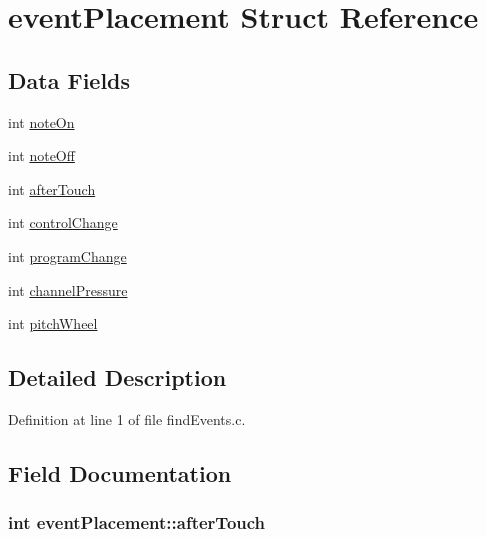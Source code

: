 \hypertarget{structevent_placement}{\section{event\+Placement Struct Reference}
\label{structevent_placement}
}
\subsection*{Data Fields}
\begin{DoxyCompactItemize}
\item 
int \hyperlink{structevent_placement_afda36632eb365d3abc4a44d17fd42f89}{note\+On}
\item 
int \hyperlink{structevent_placement_a3466f6aaaf7efc6fd7fc31f4fe41c11a}{note\+Off}
\item 
int \hyperlink{structevent_placement_a08c997e580c5dbae05269956b0353607}{after\+Touch}
\item 
int \hyperlink{structevent_placement_aa4a1d84f7b34a1c3f193a940de8e0aab}{control\+Change}
\item 
int \hyperlink{structevent_placement_a047734cc2a3854a154c3717479cf88b0}{program\+Change}
\item 
int \hyperlink{structevent_placement_aa862fb0adf136bad91e493ae93a703bb}{channel\+Pressure}
\item 
int \hyperlink{structevent_placement_a518dafda61912ec33cc1db88e3e559fa}{pitch\+Wheel}
\end{DoxyCompactItemize}


\subsection{Detailed Description}


Definition at line 1 of file find\+Events.\+c.



\subsection{Field Documentation}
\hypertarget{structevent_placement_a08c997e580c5dbae05269956b0353607}{
\subsubsection[{after\+Touch}]{\setlength{\rightskip}{0pt plus 5cm}int event\+Placement\+::after\+Touch}}\label{structevent_placement_a08c997e580c5dbae05269956b0353607}


